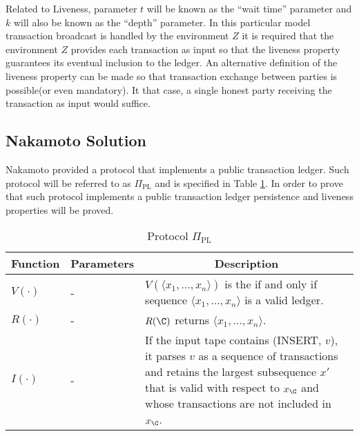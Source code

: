 \documentclass[..]{subfiles}
\begin{document}
Related to Liveness, parameter $t$ will be known as the ``wait time'' parameter and $k$ will also be known as the ``depth'' parameter. In this particular model transaction broadcast is handled by the environment $Z$ it is required that the environment $Z$ provides each transaction as input so that the liveness property guarantees its eventual inclusion to the ledger. An alternative definition of the liveness property can be made so that transaction exchange between parties is possible(or even mandatory). It that case, a single honest party receiving the transaction as input would suffice.


\subsection{Nakamoto Solution}

Nakamoto provided a protocol that implements a public transaction ledger. Such protocol will be referred to as $\Pi_{\textrm{PL}}$ and is specified in Table \ref{tab:protocolPL}. In order to prove that such protocol implements a public transaction ledger persistence and liveness properties will be proved.

\begin{centering}
	\begin{table}[H]
	\begin{tabular}{m{}<{\centering} m{}<{\centering} m{}}
		\toprule
		\textbf{Function } & \textbf{Parameters} & \multicolumn{1}{c}{\textbf{Description}}\\
		\toprule
		$V(\cdot)$ & - & $V(\langle x_1, \dots, x_n \rangle)$ is the if and only if sequence $\langle x_1, \dots, x_n \rangle$ is a valid ledger.\\
		\hline
		$R(\cdot)$ & - & $R(\C)$ returns $\langle x_1, \dots, x_n \rangle$.\\
		\hline
		$I(\cdot)$ & - & If the input tape contains (INSERT, $v$), it parses $v$ as a sequence of transactions and retains the largest subsequence $x'$ that is valid with respect to $x_\C$ and whose transactions are not included in $x_\C$.\\
		\bottomrule
	\end{tabular}
		\caption{Protocol $\Pi_{\textrm{PL}}$}
	\label{tab:protocolPL}
	\end{table}
\end{centering}
\end{document}

